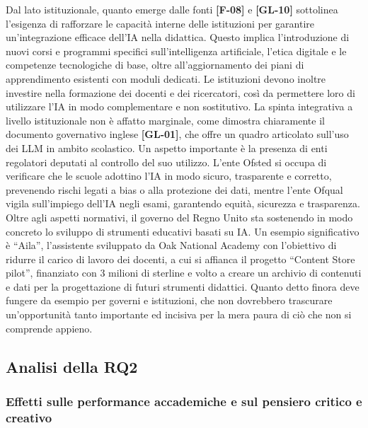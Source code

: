 \documentclass[a4paper,9pt]{article}
\begin{document}
Dal lato istituzionale, quanto emerge dalle fonti \textbf{[F-08]} e \textbf{[GL-10]} sottolinea l’esigenza di rafforzare le capacità interne delle istituzioni per garantire un’integrazione efficace dell'IA nella didattica. Questo implica l’introduzione di nuovi corsi e programmi specifici sull’intelligenza artificiale, l’etica digitale e le competenze tecnologiche di base, oltre all’aggiornamento dei piani di apprendimento esistenti con moduli dedicati. Le istituzioni devono inoltre investire nella formazione dei docenti e dei ricercatori, così da permettere loro di utilizzare l’IA in modo complementare e non sostitutivo. La spinta integrativa a livello istituzionale non è affatto marginale, come dimostra chiaramente il documento governativo inglese \textbf{[GL-01]}, che offre un quadro articolato sull’uso dei LLM in ambito scolastico. Un aspetto importante è la presenza di enti regolatori deputati al controllo del suo utilizzo. L'ente Ofsted si occupa di verificare che le scuole adottino l’IA in modo sicuro, trasparente e corretto, prevenendo rischi legati a bias o alla protezione dei dati, mentre l'ente Ofqual vigila sull’impiego dell’IA negli esami, garantendo equità, sicurezza e trasparenza. Oltre agli aspetti normativi, il governo del Regno Unito sta sostenendo in modo concreto lo sviluppo di strumenti educativi basati su IA. Un esempio significativo è “Aila”, l’assistente sviluppato da Oak National Academy con l’obiettivo di ridurre il carico di lavoro dei docenti, a cui si affianca il progetto “Content Store pilot”, finanziato con 3 milioni di sterline e volto a creare un archivio di contenuti e dati per la progettazione di futuri strumenti didattici. Quanto detto finora deve fungere da esempio per governi e istituzioni, che non dovrebbero trascurare un'opportunità tanto importante ed incisiva per la mera paura di ciò che non si comprende appieno.

\subsection{Analisi della RQ2}
\subsubsection{Effetti sulle performance accademiche e sul pensiero critico e creativo}
\end{document}
